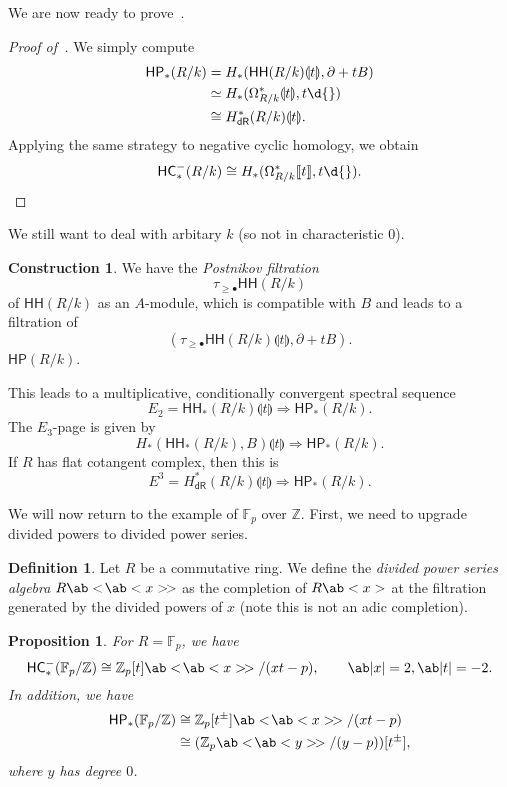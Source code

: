 \documentclass[10pt]{amsart}
\newtheorem{prop}[thm]{Proposition}
\theoremstyle{definition}
\newtheorem{defn}[thm]{Definition}
\newtheorem{con}[thm]{Construction}
\theoremstyle{remark}
\theoremstyle{plain}
\theoremstyle{definition}
\theoremstyle{remark}
\newcommand{\Z}{\mathbb{Z}}
\newcommand{\F}{\mathbb{F}}
\newcommand{\ms}[1]{\mathsf{#1}}
\newcommand{\1}{\mathbf{1}}
\newcommand{\2}{\mathbf{2}}
\newcommand{\3}{\mathbf{3}}
\newcommand{\ps}[1]{\llbracket #1 \rrbracket}
\newcommand{\ls}[1]{\llparenthesis #1 \rrparenthesis}
\newcommand{\dps}[1]{\ab<\!\ab< #1 >\!>}
\newcommand{\HC}{\ms{HC}}
\newcommand{\HH}{\ms{HH}}
\newcommand{\HP}{\ms{HP}}
\newcommand{\dR}{\ms{dR}}
\begin{document}
We are now ready to prove~.
\begin{proof}[Proof of~]
    We simply compute
    \begin{align*}
        \HP_*(R/k) &= H_*(\HH(R/k)\ls{t}, \partial + tB) \\
        &\simeq H_*(\Omega^*_{R/k} \ls{t}, t\d{}) \\
        &\cong H^*_{\dR}(R/k) \ls{t}.
    \end{align*}
    Applying the same strategy to negative cyclic homology, we obtain
    \[ \HC_*^-(R/k) \cong H_*(\Omega^*_{R/k}\ps{t}, t\d{}). \qedhere \]
\end{proof}

We still want to deal with arbitary $k$ (so not in characteristic $0$). 
\begin{con}
    We have the \textit{Postnikov filtration}
    \[ \tau_{\geq \bullet} \HH(R/k) \]
    of $\HH(R/k)$ as an $A$-module, which is compatible with $B$ and leads to a filtration of
    \[ (\tau_{\geq \bullet} \HH(R/k)\ls{t}, \partial + tB). \]
    $\HP(R/k)$. 
\end{con}

This leads to a multiplicative, conditionally convergent spectral sequence
\[ E_2 = \HH_*(R/k) \ls{t} \Longrightarrow \HP_*(R/k). \]
The $E_3$-page is given by
\[ H_*(\HH_*(R/k), B)\ls{t} \Longrightarrow \HP_*(R/k). \]
If $R$ has flat cotangent complex, then this is
\[ E^3 = H^*_{\dR}(R/k)\ls{t} \Longrightarrow \HP_*(R/k). \]

We will now return to the example of $\F_p$ over $\Z$. First, we need to upgrade divided powers to divided power series.

\begin{defn}
    Let $R$ be a commutative ring. We define the \textit{divided power series algebra} $R \ab<\!\ab<x>\!>$ as the completion of $R\ab<x>$ at the filtration generated by the divided powers of $x$ (note this is not an adic completion).
\end{defn}

\begin{prop}
    For $R = \F_p$, we have
    \[ \HC_*^-(\F_p/\Z) \cong \Z_p[t]\dps{x} / (xt-p), \qquad \ab|x|=2, \ab|t|=-2. \]
    In addition, we have
    \begin{align*}
        \HP_*(\F_p/\Z) &\cong \Z_p[t^{\pm}] \dps{x} / (xt-p)  \\
        &\cong (\Z_p \dps{y}/(y-p) )[ t^{\pm}],
    \end{align*}
    where $y$ has degree $0$.
\end{prop}
\end{document}
